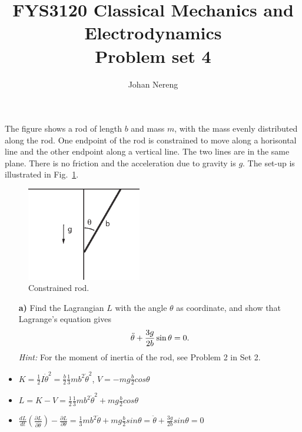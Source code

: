 \documentclass[11pt,a4paper]{report}
\title{FYS3120 Classical Mechanics and Electrodynamics\\ 
\vspace{15mm}Problem set 4}
\newcounter{excount}[chapter]
\newenvironment{exercise}[1][]{\addtocounter{excount}{1} \noindent {\bf Problem
    \arabic{excount} \ \ #1}\hspace{2mm}}{\vspace{4mm}}
\begin{document}
\author{Johan Nereng}
\maketitle


\begin{exercise}
The figure shows a rod of length $b$ and mass $m$, with the mass evenly distributed along the rod.
One endpoint of the rod is constrained to move along a horisontal line and the other endpoint along a vertical line. The two lines are in the same plane. There is no friction and the acceleration due to gravity is $g$. The set-up is illustrated in Fig.~\ref{fig:con_rod}.

\begin{figure}[h]
\begin{center}
\includegraphics[width=5cm]{ConstrainedRod.eps}
\end{center}
\caption{Constrained rod.}
\label{fig:con_rod}
\end{figure}

\begin{itemize}
\item[\bf a)] Find the Lagrangian $L$ with the angle $\theta$ as coordinate, and show that Lagrange's equation gives
\begin{equation}
\ddot\theta+{3g\over {2b}}\sin\theta=0.
\end{equation}
{\it Hint:} For the moment of inertia of the rod, see Problem 2 in Set 2.

\item $K=\frac{1}{2}I\dot{\theta}^2=\frac{b}{2}\frac{1}{3}mb^2\dot{\theta}^2$, $V=-mg\frac{b}{2}cos \theta$
\item $L=K-V=\frac{1}{2}\frac{1}{3}mb^2\dot{\theta}^2+mg\frac{b}{2}cos \theta$
\item $\frac{dL}{dt}(\frac{\partial L}{\partial \dot{\theta}})-\frac{\partial L}{\partial \theta}=\frac{1}{3}mb^2\ddot{\theta}+mg\frac{b}{2}sin \theta=\ddot{\theta}+\frac{3g}{2b}sin\theta=0$





\end{itemize}
\end{exercise}
\end{document}
